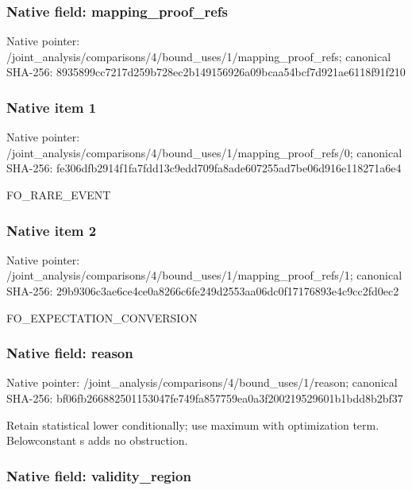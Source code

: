\documentclass[10pt,a4paper]{article}
\begin{document}
\subsubsection{Native field: mapping\_proof\_refs}


Native pointer: /joint\_analysis/comparis\allowbreak{}ons/4/bound\_uses/1/mappi\allowbreak{}ng\_proof\_refs; canonical SHA-256: 8935899cc7217d259b728ec2\allowbreak{}b149156926a09bcaa54bcf7d\allowbreak{}921ae6118f91f210



\subsubsection{Native item 1}


Native pointer: /joint\_analysis/comparis\allowbreak{}ons/4/bound\_uses/1/mappi\allowbreak{}ng\_proof\_refs/0; canonical SHA-256: fe306dfb2914f1fa7fdd13c9\allowbreak{}edd709fa8ade607255ad7be0\allowbreak{}6d916e118271a6e4


FO\_RARE\_EVENT


\subsubsection{Native item 2}


Native pointer: /joint\_analysis/comparis\allowbreak{}ons/4/bound\_uses/1/mappi\allowbreak{}ng\_proof\_refs/1; canonical SHA-256: 29b9306c3ae6ce4ce0a8266c\allowbreak{}6fe249d2553aa06dc0f17176\allowbreak{}893e4c9cc2fd0ec2


FO\_EXPECTATION\_CONVERSION


\subsubsection{Native field: reason}


Native pointer: /joint\_analysis/comparis\allowbreak{}ons/4/bound\_uses/1/reaso\allowbreak{}n; canonical SHA-256: bf06fb266882501153047fe7\allowbreak{}49fa857759ea0a3f20021952\allowbreak{}9601b1bdd8b2bf37


Retain statistical lower conditionally; use maximum with optimization term. Belowconstant s adds no obstruction.


\subsubsection{Native field: validity\_region}
\end{document}
